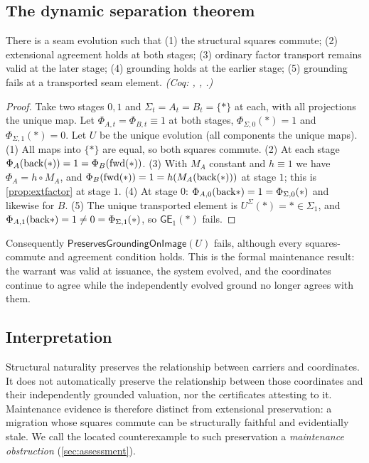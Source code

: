 \subsection{The dynamic separation theorem}
\begin{thm}\label{thm:dynfail}
There is a seam evolution such that
(1) the structural squares commute;
(2) extensional agreement holds at both stages;
(3) ordinary factor transport remains valid at the later stage;
(4) grounding holds at the earlier stage;
(5) grounding fails at a transported seam element.
\emph{(Coq: , , .)}
\end{thm}
\begin{proof}
Take two stages $0,1$ and $\Sigma_t = A_t = B_t = \{\ast\}$ at each, with all projections the unique map. Let $\Phi_{A,t} = \Phi_{B,t} \equiv 1$ at both stages, $\Phi_{\Sigma,0}(\ast) = 1$ and $\Phi_{\Sigma,1}(\ast) = 0$. Let $U$ be the unique evolution (all components the unique maps).
(1) All maps into $\{\ast\}$ are equal, so both squares commute.
(2) At each stage $\Phi_A(\mathrm{back}(\ast)) = 1 = \Phi_B(\mathrm{fwd}(\ast))$.
(3) With $M_A$ constant and $h \equiv 1$ we have $\Phi_A = h \circ M_A$, and $\Phi_B(\mathrm{fwd}(\ast)) = 1 = h(M_A(\mathrm{back}(\ast)))$ at stage $1$; this is \cref{prop:extfactor} at stage $1$.
(4) At stage $0$: $\Phi_{A,0}(\mathrm{back} \ast) = 1 = \Phi_{\Sigma,0}(\ast)$ and likewise for $B$.
(5) The unique transported element is $U^\Sigma(\ast) = \ast \in \Sigma_1$, and $\Phi_{A,1}(\mathrm{back} \ast) = 1 \neq 0 = \Phi_{\Sigma,1}(\ast)$, so $\mathsf{GE}_1(\ast)$ fails.
\end{proof}
Consequently $\mathsf{PreservesGroundingOnImage}(U)$ fails, although every squares-commute and agreement condition holds. This is the formal maintenance result: the warrant was valid at issuance, the system evolved, and the coordinates continue to agree while the independently evolved ground no longer agrees with them.

\subsection{Interpretation}
Structural naturality preserves the relationship between carriers and coordinates. It does not automatically preserve the relationship between those coordinates and their independently grounded valuation, nor the certificates attesting to it. Maintenance evidence is therefore distinct from extensional preservation: a migration whose squares commute can be structurally faithful and evidentially stale. We call the located counterexample to such preservation a \emph{maintenance obstruction} (\cref{sec:assessment}).
